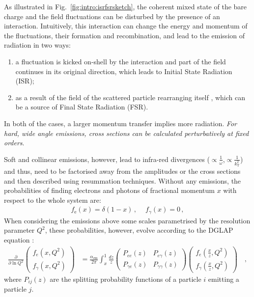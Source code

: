 As illustrated in Fig.~\ref{fig:intro:isrfsrsketch}, the coherent mixed state of the bare charge and the field fluctuations can be disturbed by the presence of an interaction. Intuitively, this interaction can change the energy and momentum of the fluctuations, their formation and recombination, and lead to the emission of radiation in two ways:
\begin{enumerate}
\item a fluctuation is kicked on-shell by the interaction and part of the field continues in its original direction, which leads to Initial State Radiation (ISR);
\item as a result of the field of the scattered particle rearranging itself , which can be a source of Final State Radiation (FSR).
\end{enumerate}

In both of the cases, a larger momentum transfer implies more radiation. \textit{For hard, wide angle emissions, cross sections can be calculated perturbatively at fixed orders}. 

Soft and collinear emissions, however, lead to infra-red divergences ($\propto \frac{1}{\omega}$,$\propto \frac{1}{k_\mathrm{T}^2}$) and thus, need to be factorised away from the amplitudes or the cross sections and then described using resummation techniques. Without any emissions, the probabilities of finding electrons and photons of fractional momentum $x$ with respect to the whole system are:
\begin{align}
f_\mathrm{e} (x) = \delta (1-x) \, , \quad \ f_\gamma(x) = 0 \, ,
\end{align}
When considering the emissions above some scales parametrised by the resolution parameter $Q^2$, these probabilities, however, evolve according to the DGLAP equation \cite{altarelliAsymptoticFreedomParton1977} :
\begin{align}
\label{eq:intro:dglap}
\frac{\partial}{\partial\ln Q^2}
\begin{pmatrix}
f_e(x, Q^2)\\
f_{\gamma}(x, Q^2)
\end{pmatrix}
&= \frac{\alpha_\mathrm{em}}{2\pi}
\int_x^1 \frac{dz}{z}
\begin{pmatrix}
P_{ee}(z) & P_{e\gamma}(z)\\
P_{\gamma e}(z) & P_{\gamma\gamma}(z)
\end{pmatrix}
\begin{pmatrix}
f_e\left(\frac{x}{z}, Q^2\right)\\
f_{\gamma}\left(\frac{x}{z}, Q^2\right)
\end{pmatrix} \quad ,
\end{align}
where $P_{ij}(z)$ are the splitting probability functions of a particle $i$ emitting a particle $j$.

